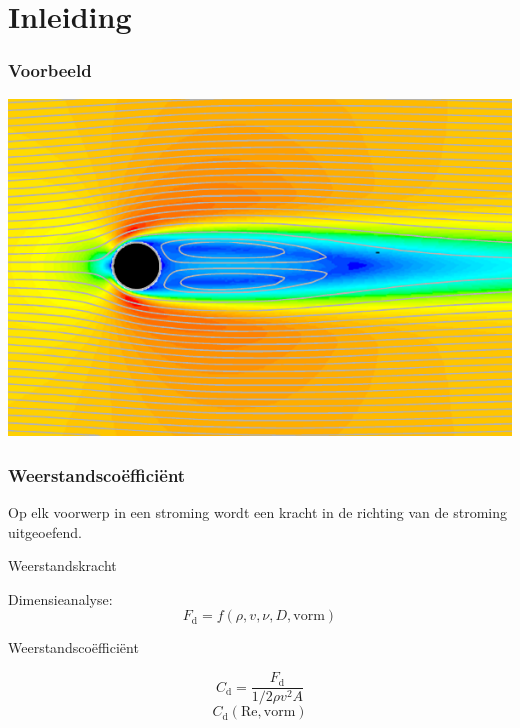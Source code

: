 \documentclass[t]{beamer}
\subtitle{Vormweerstand en vleugelprofielen}
\begin{document}
	\frame{\titlepage}
	\section{Inleiding}
	\begin{frame}
		\frametitle{Voorbeeld}
		\center
		\vspace{-0.5cm}
    	\includegraphics[width=\textwidth]{fig/uitwendige_stroming/Cilinderstroming_snelheid_stroomlijnen_Re100}
  	\end{frame}
	\begin{frame}
		\frametitle{Weerstandscoëfficiënt}
		Op elk voorwerp in een stroming wordt een kracht in de richting van de stroming uitgeoefend.
		
		\pause
		\begin{center}
			Weerstandskracht
		\end{center}			
		
		\pause
		Dimensieanalyse:
		\begin{equation*}
    		F_\mathrm{d} = f\left( \rho,v,\nu,D,\mathrm{vorm} \right)
    	\end{equation*}
		
		\pause
		\vspace{0.3cm}
		\begin{center}
			Weerstandscoëfficiënt
		\end{center}
    	\begin{equation}
    		C_\mathrm{d} = \frac{F_\mathrm{d}}{1/2 \rho v^2 A}
    	\end{equation}
    	\begin{equation*}
    		C_\mathrm{d}(\mathrm{Re},\mathrm{vorm})
    	\end{equation*}
  	\end{frame}
\end{document}
